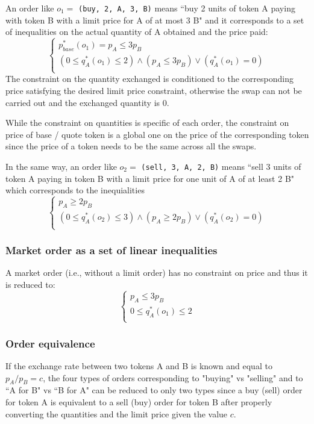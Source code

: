 \documentclass[11pt, reqno]{amsart}
\begin{document}
An order like $o_1 =$ \texttt{(buy, 2, A, 3, B)} means ``buy 2 units of token A
paying with token B with a limit price for A of at most 3 B" and it corresponds to a
set of inequalities on the actual quantity of A obtained and the price paid:
\begin{equation}
  \begin{cases}
    p_{base}^*(o_1) = p_A \le 3 p_B \\
    (0 \le q_{A}^*(o_1) \le 2) \land (p_A \le 3 p_B) \lor (q_A^*(o_1) = 0)\\
  \end{cases}
\end{equation}
The constraint on the quantity exchanged is conditioned to the corresponding
price satisfying the desired limit price constraint, otherwise the swap can not
be carried out and the exchanged quantity is 0.

While the constraint on quantities is specific of each order, the constraint on
price of base / quote token is a global one on the price of the corresponding
token since the price of a token needs to be the same across all the swaps.

In the same way, an order like $o_2 =$ \texttt{(sell, 3, A, 2, B)} means ``sell
3 units of token A paying in token B with a limit price for one unit of A of at
least 2 B" which corresponds to the inequialities
\begin{equation}
  \begin{cases}
    p_A \ge 2 p_B \\
    (0 \le q_{A}^*(o_2) \le 3) \land (p_A \ge 2 p_B) \lor (q_A^*(o_2) = 0)\\
  \end{cases}
\end{equation}

\subsubsection{Market order as a set of linear inequalities}
A market order (i.e., without a limit order) has no constraint on price and thus
it is reduced to:
\begin{equation}
  \begin{cases}
    p_A \le 3 p_B \\
    0 \le q_{A}^*(o_1) \le 2 \\
  \end{cases}
\end{equation}

\subsubsection{Order equivalence}
If the exchange rate between two tokens A and B is known and equal to
$p_A / p_B = c$, the four types of orders corresponding to "buying" vs "selling"
and to ``A for B" vs ``B for A" can be reduced to only two types since a buy
(sell) order for token A is equivalent to a sell (buy) order for token
B after properly converting the quantities and the limit price given the value
$c$.
\end{document}
